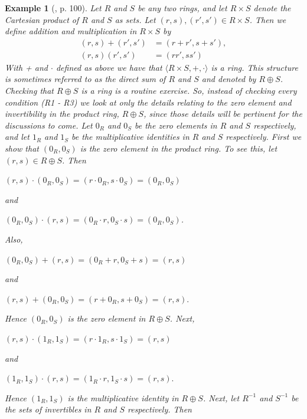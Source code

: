 \documentclass[12pt, oneside]{book}
\newtheorem{example}[theorem]{Example}
\begin{document}
\begin{example}[\cite{G1}, p. 100]
\normalfont
\noindent Let $R$ and $S$ be any two rings, and let $R \times S$ denote the Cartesian product of $R$ 
and $S$ as sets. Let $(r, s), (r', s') \in R \times S$. Then we define addition and multiplication 
in $R \times S$ by
\begin{align*}
(r, s) + (r', s') &= (r + r', s + s'),\\
(r, s)(r', s') &= (r r', s s')
\end{align*}
With + and $\cdot$ defined as above we have that $\langle R \times S, +, \cdot \rangle$ is a ring. 
This structure is sometimes referred to as the {\sl direct sum} of $R$ and $S$ and denoted by 
$R \oplus S$. Checking that $R \oplus S$ is a ring is a routine exercise. 
So, instead of checking every condition (R1 - R3) we look at only the details relating to the zero element 
and invertibility in the product ring, $R \oplus S$, since those details will be pertinent for the
discussions to come. 
\vskip 0.3cm
\noindent Let $0_R$ and $0_S$ be the zero elements in $R$ and $S$ respectively, and let $1_R$ and $1_S$ 
be the multiplicative identities in $R$ and $S$ respectively. 
\vskip 0.3cm
\noindent First we show that $(0_R, 0_S)$ is the zero element in the product ring. To see this, 
let $(r, s) \in R \oplus S$. Then
\begin{center}
$(r, s) \cdot (0_R, 0_S) = (r \cdot 0_R, s \cdot 0_S) = (0_R, 0_S)$
\end{center}
and 
\begin{center}
$(0_R, 0_S)  \cdot  (r, s) = ( 0_R \cdot r , 0_S  \cdot s ) = (0_R, 0_S)$.
\end{center}
Also,
\begin{center}
$(0_R, 0_S) + (r, s)  = (0_R + r, 0_S + s) = (r, s)$
\end{center}
and
\begin{center}
$(r, s) + (0_R, 0_S)   = (r + 0_R, s + 0_S) = (r, s).$
\end{center}
Hence $(0_R, 0_S)$ is the zero element in $R \oplus S$. 
Next,
\begin{center}
$(r, s) \cdot (1_R, 1_S) = (r \cdot 1_R, s \cdot 1_S) = (r, s)$
\end{center}
and
\begin{center}
$(1_R, 1_S) \cdot (r, s)  = (1_R \cdot r, 1_S \cdot s) = (r, s).$
\end{center}
Hence $(1_R, 1_S)$ is the multiplicative identity in $R \oplus S$. 
\vskip 0.3cm
\noindent Next, let $R^{-1}$ and $S^{-1}$ be the sets of invertibles in $R$ and $S$ respectively. Then

\end{example}
\end{document}
